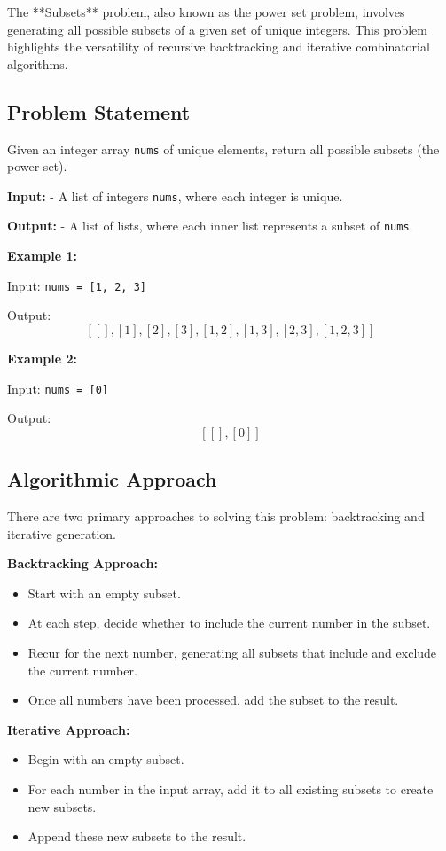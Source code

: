 
\label{problem:Subsets}

The **Subsets** problem, also known as the power set problem, involves generating all possible subsets of a given set of unique integers. This problem highlights the versatility of recursive backtracking and iterative combinatorial algorithms.

\subsection*{Problem Statement}
Given an integer array \texttt{nums} of unique elements, return all possible subsets (the power set).

\textbf{Input:}
- A list of integers \texttt{nums}, where each integer is unique.

\textbf{Output:}
- A list of lists, where each inner list represents a subset of \texttt{nums}.

\textbf{Example 1:}

Input: \texttt{nums = [1, 2, 3]}

Output: \[
\left[ 
[], [1], [2], [3], [1, 2], [1, 3], [2, 3], [1, 2, 3] 
\right]
\]

\textbf{Example 2:}

Input: \texttt{nums = [0]}

Output: \[
\left[ 
[], [0] 
\right]
\]

\subsection*{Algorithmic Approach}
There are two primary approaches to solving this problem: backtracking and iterative generation.

\textbf{Backtracking Approach:}
\begin{itemize}
    \item Start with an empty subset.
    \item At each step, decide whether to include the current number in the subset.
    \item Recur for the next number, generating all subsets that include and exclude the current number.
    \item Once all numbers have been processed, add the subset to the result.
\end{itemize}

\textbf{Iterative Approach:}
\begin{itemize}
    \item Begin with an empty subset.
    \item For each number in the input array, add it to all existing subsets to create new subsets.
    \item Append these new subsets to the result.
\end{itemize}

